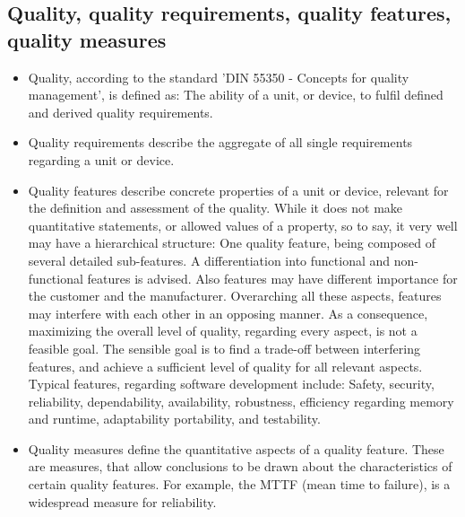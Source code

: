 	\subsection{Quality, quality requirements, quality features, quality measures}
		\begin{itemize}
		\item Quality, according to the standard 'DIN 55350 - Concepts for quality management', is defined as: The ability of a unit, or device, to fulfil defined and derived quality requirements.
		\item Quality requirements describe the aggregate of all single requirements regarding a unit or device.
		\item Quality features describe concrete properties of a unit or device, relevant for the definition and assessment of the quality. While it does not make quantitative statements, or allowed values of a property, so to say, it very well may have a hierarchical structure: One quality feature, being composed of several detailed sub-features. A differentiation into functional and non-functional features is advised. Also features may have different importance for the customer and the manufacturer. Overarching all these aspects, features may interfere with each other in an opposing manner. As a consequence, maximizing the overall level of quality, regarding every aspect, is not a feasible goal. The sensible goal is to find a trade-off between interfering features, and achieve a sufficient level of quality for all relevant aspects. Typical features, regarding software development include: Safety, security, reliability, dependability, availability, robustness, efficiency regarding memory and runtime, adaptability portability, and testability.
		\item {Quality measures} define the quantitative aspects of a quality feature. These are measures, that allow conclusions to be drawn about the characteristics of certain quality features. For example, the MTTF (mean time to failure), is a widespread measure for reliability.
		\end{itemize}
	

